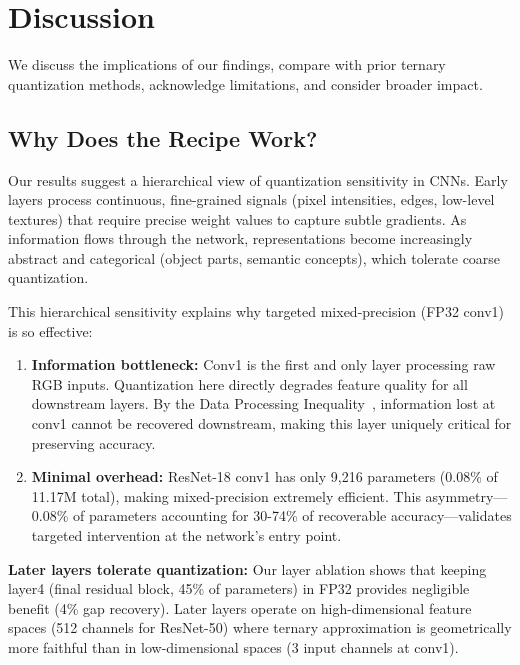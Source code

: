 
\section{Discussion}
\label{sec:discussion}

We discuss the implications of our findings, compare with prior ternary quantization methods, acknowledge limitations, and consider broader impact.

\subsection{Why Does the Recipe Work?}

Our results suggest a hierarchical view of quantization sensitivity in CNNs. Early layers process continuous, fine-grained signals (pixel intensities, edges, low-level textures) that require precise weight values to capture subtle gradients. As information flows through the network, representations become increasingly abstract and categorical (object parts, semantic concepts), which tolerate coarse quantization.

This hierarchical sensitivity explains why targeted mixed-precision (FP32 conv1) is so effective:

\begin{enumerate}
    \item \textbf{Information bottleneck:} Conv1 is the first and only layer processing raw RGB inputs. Quantization here directly degrades feature quality for all downstream layers. By the Data Processing Inequality~\cite{cover2006information}, information lost at conv1 cannot be recovered downstream, making this layer uniquely critical for preserving accuracy.

    \item \textbf{Minimal overhead:} ResNet-18 conv1 has only 9,216 parameters (0.08\% of 11.17M total), making mixed-precision extremely efficient. This asymmetry—0.08\% of parameters accounting for 30-74\% of recoverable accuracy—validates targeted intervention at the network's entry point.
\end{enumerate}

\textbf{Later layers tolerate quantization:} Our layer ablation shows that keeping layer4 (final residual block, 45\% of parameters) in FP32 provides negligible benefit (4\% gap recovery). Later layers operate on high-dimensional feature spaces (512 channels for ResNet-50) where ternary approximation is geometrically more faithful than in low-dimensional spaces (3 input channels at conv1).

